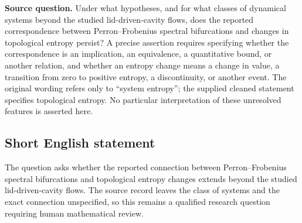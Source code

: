 \documentclass[11pt]{article}
\begin{document}
\textbf{Source question.} Under what hypotheses, and for what classes of dynamical systems beyond the studied lid-driven-cavity flows, does the reported correspondence between Perron--Frobenius spectral bifurcations and changes in topological entropy persist? A precise assertion requires specifying whether the correspondence is an implication, an equivalence, a quantitative bound, or another relation, and whether an entropy change means a change in value, a transition from zero to positive entropy, a discontinuity, or another event. The original wording refers only to ``system entropy''; the supplied cleaned statement specifies topological entropy. No particular interpretation of these unresolved features is asserted here.
\subsection{Short English statement}
The question asks whether the reported connection between Perron--Frobenius spectral bifurcations and topological entropy changes extends beyond the studied lid-driven-cavity flows. The source record leaves the class of systems and the exact connection unspecified, so this remains a qualified research question requiring human mathematical review.
\end{document}
